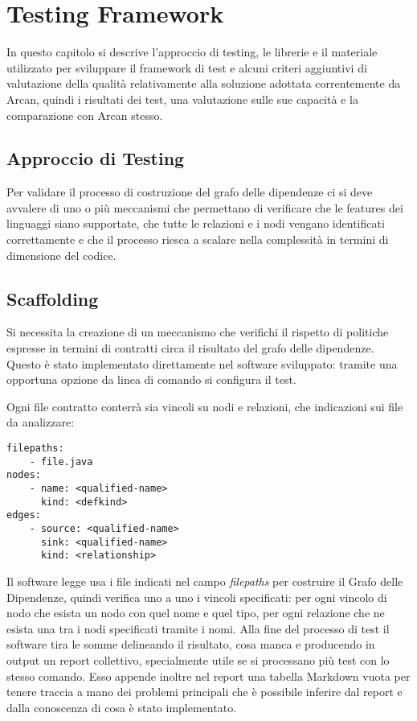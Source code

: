 \chapter{Testing Framework}

In questo capitolo si descrive l'approccio di testing, le librerie e il materiale utilizzato per sviluppare il framework di test e alcuni criteri aggiuntivi di valutazione della qualit\`a relativamente alla soluzione adottata correntemente da Arcan, quindi i risultati dei test, una valutazione sulle sue capacit\`a e la comparazione con Arcan stesso.

\section{Approccio di Testing}

Per validare il processo di costruzione del grafo delle dipendenze ci si deve avvalere di uno o pi\`u meccanismi che permettano di verificare che le features dei linguaggi siano supportate, che tutte le relazioni e i nodi vengano identificati correttamente e che il processo riesca a scalare nella complessit\`a in termini di dimensione del codice.

\section{Scaffolding}

Si necessita la creazione di un meccanismo che verifichi il rispetto di politiche espresse in termini di contratti circa il risultato del grafo delle dipendenze. Questo \`e stato implementato direttamente nel software sviluppato: tramite una opportuna opzione da linea di comando si configura il test.

Ogni file contratto conterr\`a sia vincoli su nodi e relazioni, che indicazioni sui file da analizzare:

\begin{lstlisting}
filepaths:
    - file.java
nodes:
    - name: <qualified-name>
      kind: <defkind>
edges:
    - source: <qualified-name>
      sink: <qualified-name>
      kind: <relationship>
\end{lstlisting}

Il software legge usa i file indicati nel campo \emph{filepaths} per costruire il Grafo delle Dipendenze, quindi verifica uno a uno i vincoli specificati: per ogni vincolo di nodo che esista un nodo con quel nome e quel tipo, per ogni relazione che ne esista una tra i nodi specificati tramite i nomi.
Alla fine del processo di test il software tira le somme delineando il risultato, cosa manca e producendo in output un report collettivo, specialmente utile se si processano pi\`u test con lo stesso comando. Esso appende inoltre nel report una tabella Markdown vuota per tenere traccia a mano dei problemi principali che \`e possibile inferire dal report e dalla conoscenza di cosa \`e stato implementato.

